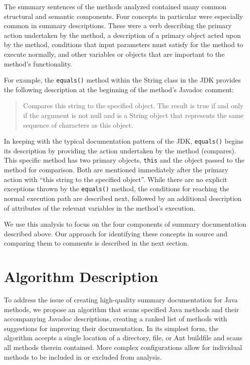 \documentclass[preprint]{sigplanconf}
\begin{document}
The summary sentences of the methods analyzed contained many common structural and semantic components. Four concepts in particular were especially common in summary descriptions. These were a verb describing the primary action undertaken by the method, a description of a primary object acted upon by the method, conditions that input parameters must satisfy for the method to execute normally, and other variables or objects that are important to the method's functionality.

For example, the \verb|equals()| method within the String class in the JDK provides the following description at the beginning of the method's Javadoc comment:

\begin{quotation}
Compares this string to the specified object. The result is true if and only if the argument is not null and is a String object that represents the same sequence of characters as this object.
\end{quotation}

In keeping with the typical documentation pattern of the JDK, \verb|equals()| begins its description by providing the action undertaken by the method (compares). This specific method has two primary objects, \verb|this| and the object passed to the method for comparison. Both are mentioned immediately after the primary action with ``this string to the specified object''. While there are no explicit exceptions thrown by the \verb|equals()| method, the conditions for reaching the normal execution path are described next, followed by an additional description of attributes of the relevant variables in the method's execution.

We use this analysis to focus on the four components of summary documentation described above. Our approach for identifying these concepts in source and comparing them to comments is described in the next section.

\section{Algorithm Description}
To address the issue of creating high-quality summary documentation for Java methods, we propose an algorithm that scans specified Java methods and their accompanying Javadoc descriptions, creating a ranked list of methods with suggestions for improving their documentation. In its simplest form, the algorithm accepts a single location of a directory, file, or Ant buildfile and scans all methods therein contained. More complex configurations allow for individual methods to be included in or excluded from analysis.
\end{document}
